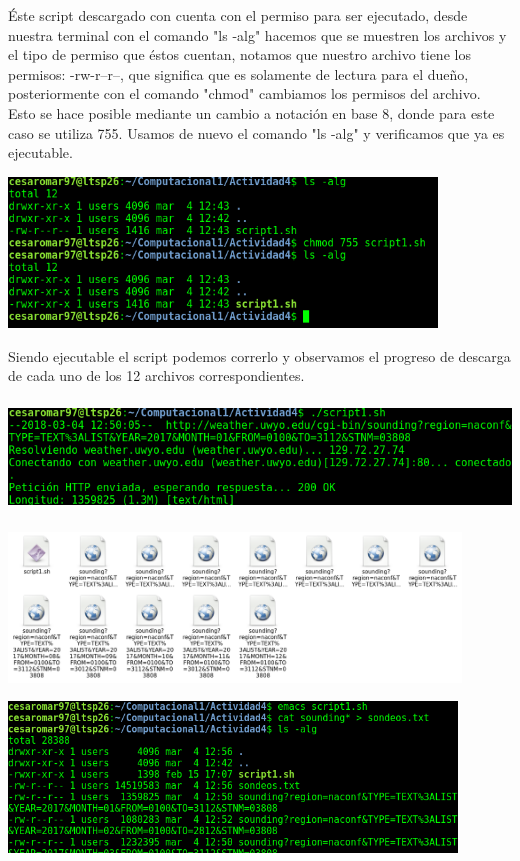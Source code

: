 \documentclass[12pt]{article}
\begin{document}
Éste script descargado con cuenta con el permiso para ser ejecutado, desde nuestra terminal con el comando "ls -alg" hacemos que se muestren los archivos y el tipo de permiso que éstos cuentan, notamos que nuestro archivo tiene los permisos: -rw-r–r–, que significa que es solamente de lectura para el dueño, posteriormente con el comando "chmod" cambiamos los permisos del archivo. Esto se hace posible mediante un cambio a notación en base 8, donde para este caso se utiliza 755. Usamos de nuevo el comando "ls -alg" y verificamos que ya es ejecutable.
\begin{center}
	\includegraphics[height=4cm]{permiso.png}
\end{center}
Siendo ejecutable el script podemos correrlo y observamos el progreso de descarga de cada uno de los 12 archivos correspondientes.
\begin{center}
	\includegraphics[height=3cm]{descargando.png}
\end{center}
\begin{center}
	\includegraphics[height=4cm]{listo.png}
\end{center}
\begin{center}
	\includegraphics[height=4cm]{contenido.png}
\end{center}
\end{document}
